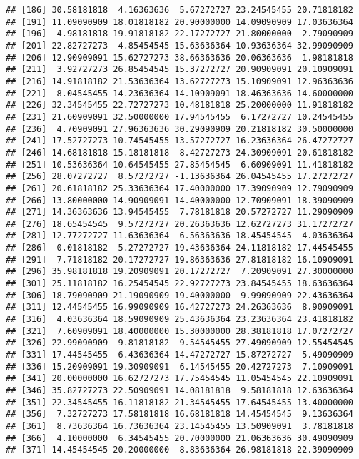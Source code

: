 \documentclass[]{book}
\begin{document}
\begin{verbatim}
## [186] 30.58181818  4.16363636  5.67272727 23.24545455 20.71818182
## [191] 11.09090909 18.01818182 20.90000000 14.09090909 17.03636364
## [196]  4.98181818 19.91818182 22.17272727 21.80000000 -2.79090909
## [201] 22.82727273  4.85454545 15.63636364 10.93636364 32.99090909
## [206] 12.90909091 15.62727273 38.66363636 20.06363636  1.98181818
## [211]  3.92727273 26.85454545 15.37272727 20.90909091 20.10909091
## [216] 14.91818182 21.53636364 13.62727273 15.10909091 12.96363636
## [221]  8.04545455 14.23636364 14.10909091 18.46363636 14.60000000
## [226] 32.34545455 22.72727273 10.48181818 25.20000000 11.91818182
## [231] 21.60909091 32.50000000 17.94545455  6.17272727 10.24545455
## [236]  4.70909091 27.96363636 30.29090909 20.21818182 30.50000000
## [241] 17.52727273 10.74545455 13.57272727 16.23636364 26.47272727
## [246] 14.68181818 15.18181818  8.42727273 24.30909091 20.61818182
## [251] 10.53636364 10.64545455 27.85454545  6.60909091 11.41818182
## [256] 28.07272727  8.57272727 -1.13636364 26.04545455 17.27272727
## [261] 20.61818182 25.33636364 17.40000000 17.39090909 12.79090909
## [266] 13.80000000 14.90909091 14.40000000 12.70909091 18.39090909
## [271] 14.36363636 13.94545455  7.78181818 20.57272727 11.29090909
## [276] 18.65454545  9.57272727 20.26363636 12.62727273 31.17272727
## [281] 12.77272727 11.63636364  6.56363636 18.45454545  4.03636364
## [286] -0.01818182 -5.27272727 19.43636364 24.11818182 17.44545455
## [291]  7.71818182 20.17272727 19.86363636 27.81818182 16.10909091
## [296] 35.98181818 19.20909091 20.17272727  7.20909091 27.30000000
## [301] 25.11818182 16.25454545 22.92727273 23.84545455 18.63636364
## [306] 18.79090909 21.19090909 19.40000000  9.99090909 22.43636364
## [311] 12.44545455 16.99090909 16.42727273 24.26363636  8.90909091
## [316]  4.03636364 18.59090909 25.43636364 23.23636364 23.41818182
## [321]  7.60909091 18.40000000 15.30000000 28.38181818 17.07272727
## [326] 22.99090909  9.81818182  9.54545455 27.49090909 12.55454545
## [331] 17.44545455 -6.43636364 14.47272727 15.87272727  5.49090909
## [336] 15.20909091 19.30909091  6.14545455 20.42727273  7.10909091
## [341] 20.00000000 16.62727273 17.75454545 11.05454545 22.10909091
## [346] 35.82727273 22.50909091 14.08181818  9.58181818 12.63636364
## [351] 22.34545455 16.11818182 21.34545455 17.64545455 13.40000000
## [356]  7.32727273 17.58181818 16.68181818 14.45454545  9.13636364
## [361]  8.73636364 16.73636364 23.14545455 13.50909091  3.78181818
## [366]  4.10000000  6.34545455 20.70000000 21.06363636 30.49090909
## [371] 14.45454545 20.20000000  8.83636364 26.98181818 22.39090909

\end{verbatim}
\end{document}
